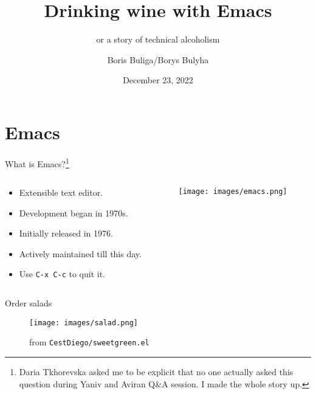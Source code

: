 \documentclass[presentation,aspectratio=169,smaller]{beamer}
\author{Boris Buliga/Borys Bulyha}
\date{December 23, 2022}
\title{Drinking wine with Emacs}
\subtitle{or a story of technical alcoholism}
\begin{document}
\maketitle
\newcommand{\mathcolorbox}[2]{%
  \begingroup
  \setlength{\fboxsep}{2pt}%
  \colorbox{#1}{$\displaystyle #2$}%
  \endgroup
}


\section{Emacs}
\label{sec:org3d9efb7}

\begin{frame}[label={sec:orgd487ae9},fragile]{What is Emacs?\footnote{Daria Tkhorevska asked me to be explicit that no one actually asked this question during Yaniv and Aviran Q\&A session. I made the whole story up.}}
 \begin{columns}
\begin{column}{0.5\columnwidth}
\begin{itemize}
\item \alert{Extensible} text editor.
\item Development began in 1970s.
\item Initially released in 1976.
\item Actively maintained till this day.
\item Use \texttt{C-x C-c} to quit it.
\end{itemize}
\end{column}

\begin{column}{0.5\columnwidth}
\begin{center}
\texttt{[image: images/emacs.png]}
\end{center}
\end{column}
\end{columns}
\end{frame}

\begin{frame}[label={sec:org1fab026}]{Order salads}
\begin{figure}[htbp]
\centering
\texttt{[image: images/salad.png]}
\caption{from \texttt{CestDiego/sweetgreen.el}}
\end{figure}
\end{frame}
\end{document}

